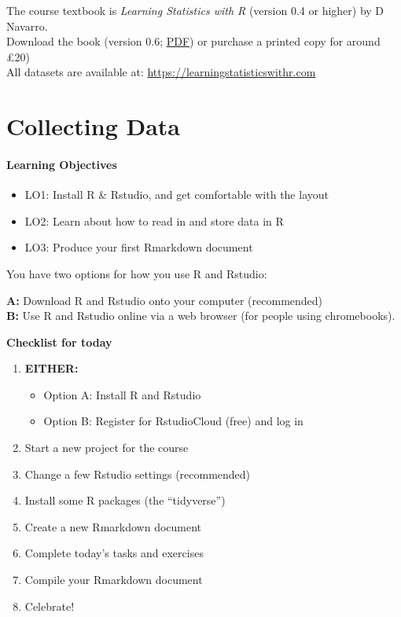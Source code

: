 \documentclass[]{book}
\providecommand{\tightlist}{%
  \setlength{\itemsep}{0pt}\setlength{\parskip}{0pt}}
\begin{document}
The course textbook is \emph{Learning Statistics with R} (version 0.4 or higher) by D Navarro.\\
Download the book (version 0.6; \href{https://learningstatisticswithr.com/lsr-0.6.pdf}{PDF}) or purchase a printed copy for around £20)\\
All datasets are available at: \url{https://learningstatisticswithr.com}

\hypertarget{chap-collecting-data}{%
\chapter{Collecting Data}\label{chap-collecting-data}}

\hypertarget{learning-objectives}{%
\subsubsection*{Learning Objectives}\label{learning-objectives}}

\begin{itemize}
\tightlist
\item
  LO1: Install R \& Rstudio, and get comfortable with the layout\\
\item
  LO2: Learn about how to read in and store data in R
\item
  LO3: Produce your first Rmarkdown document\\
\end{itemize}

You have two options for how you use R and Rstudio:

\textbf{A:} Download R and Rstudio onto your computer (recommended)\\
\textbf{B:} Use R and Rstudio online via a web browser (for people using chromebooks).

\textbf{Checklist for today}

\begin{enumerate}
\def\labelenumi{\arabic{enumi}.}
\tightlist
\item
  \textbf{EITHER:}

  \begin{itemize}
  \tightlist
  \item
    Option A: Install R and Rstudio
  \item
    Option B: Register for RstudioCloud (free) and log in
  \end{itemize}
\item
  Start a new project for the course
\item
  Change a few Rstudio settings (recommended)
\item
  Install some R packages (the ``tidyverse'')
\item
  Create a new Rmarkdown document
\item
  Complete today's tasks and exercises
\item
  Compile your Rmarkdown document
\item
  Celebrate!
\end{enumerate}
\end{document}

